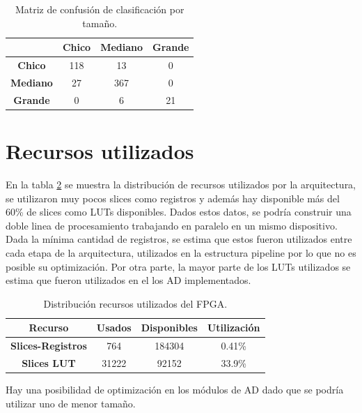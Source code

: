 \documentclass[twoside,spanish,ESP,MSc]{plantillaLabUPV}
\theoremstyle{definition}
\begin{document}
\begin{table}[!tbh]
	\caption{Matriz de confusión de clasificación por tamaño.}
	\label{mdctam}
	\centering
	\begin{tabular}{c|c|c|c|}
		\cline{2-4}
		& \textbf{Chico} & \textbf{Mediano} & \textbf{Grande} \\ \hline
		\multicolumn{1}{|c|}{\textbf{Chico}}   & 118            & 13               & 0               \\ \hline
		\multicolumn{1}{|c|}{\textbf{Mediano}} & 27             & 367              & 0               \\ \hline
		\multicolumn{1}{|c|}{\textbf{Grande}}  & 0              & 6                & 21              \\ \hline
	\end{tabular}
\end{table}


\newpage
\section{Recursos utilizados}
En la tabla \ref{resources} se muestra la distribución de recursos utilizados por la arquitectura, se utilizaron muy pocos slices como registros y además hay disponible más del 60\% de slices como LUTs disponibles. Dados estos datos, se podría construir una doble linea de procesamiento trabajando en paralelo en un mismo dispositivo. Dada la mínima cantidad de registros, se estima que estos fueron utilizados entre cada etapa de la arquitectura, utilizados en la estructura pipeline por lo que no es posible su optimización. Por otra parte, la mayor parte de los LUTs utilizados se estima que fueron utilizados en el los AD implementados.

\begin{table}[!tbh]
	\caption{Distribución recursos utilizados del FPGA.}
	\label{resources}
	\centering
	\begin{tabular}{|c|c|c|c|}
		\hline
		\textbf{Recurso}          & \textbf{Usados} & \textbf{Disponibles} & \textbf{Utilización} \\ \hline
		\textbf{Slices-Registros} & 764             & 184304               & 0.41\%               \\ \hline
		\textbf{Slices LUT}       & 31222           & 92152                & 33.9\%               \\ \hline
	\end{tabular}
\end{table}

Hay una posibilidad de optimización en los módulos de AD dado que se podría utilizar uno de menor tamaño. 
\end{document}
